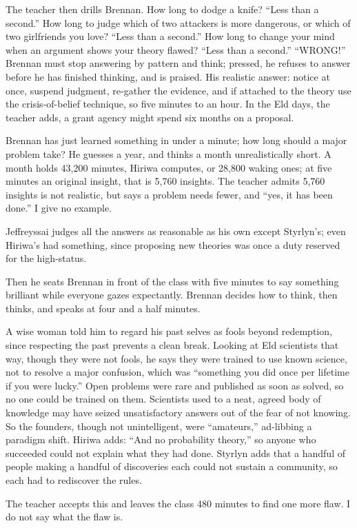 The teacher then drills Brennan. How long to dodge a knife? ``Less than a second.'' How long to judge which of two attackers is more dangerous, or which of two girlfriends you love? ``Less than a second.'' How long to change your mind when an argument shows your theory flawed? ``Less than a second.'' ``WRONG!'' Brennan must stop answering by pattern and think; pressed, he refuses to answer before he has finished thinking, and is praised. His realistic answer: notice at once, suspend judgment, re-gather the evidence, and if attached to the theory use the crisis-of-belief technique, so five minutes to an hour. In the Eld days, the teacher adds, a grant agency might spend six months on a proposal. 

Brennan has just learned something in under a minute; how long should a major problem take? He guesses a year, and thinks a month unrealistically short. A month holds 43,200 minutes, Hiriwa computes, or 28,800 waking ones; at five minutes an original insight, that is 5,760 insights. The teacher admits 5,760 insights is not realistic, but says a problem needs fewer, and ``yes, it has been done.'' I give no example.

Jeffreyssai judges all the answers as reasonable as his own except Styrlyn's; even Hiriwa's had something, since proposing new theories was once a duty reserved for the high-status.

Then he seats Brennan in front of the class with five minutes to say something brilliant while everyone gazes expectantly. Brennan decides how to think, then thinks, and speaks at four and a half minutes.

A wise woman told him to regard his past selves as fools beyond redemption, since respecting the past prevents a clean break. Looking at Eld scientists that way, though they were not fools, he says they were trained to use known science, not to resolve a major confusion, which was ``something you did once per lifetime if you were lucky.'' Open problems were rare and published as soon as solved, so no one could be trained on them. Scientists used to a neat, agreed body of knowledge may have seized unsatisfactory answers out of the fear of not knowing. So the founders, though not unintelligent, were ``amateurs,'' ad-libbing a paradigm shift. Hiriwa adds: ``And no probability theory,'' so anyone who succeeded could not explain what they had done. Styrlyn adds that a handful of people making a handful of discoveries each could not sustain a community, so each had to rediscover the rules. 

The teacher accepts this and leaves the class 480 minutes to find one more flaw.  I do not say what the flaw is.
